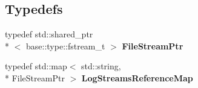 \subsection*{Typedefs}
\begin{DoxyCompactItemize}
\item 
\hypertarget{namespaceel_1_1base_a8b10bcfd674533f8340cd8c39fbf5233}{typedef std\-::shared\-\_\-ptr\\*
$<$ base\-::type\-::fstream\-\_\-t $>$ {\bfseries File\-Stream\-Ptr}}\label{namespaceel_1_1base_a8b10bcfd674533f8340cd8c39fbf5233}

\item 
\hypertarget{namespaceel_1_1base_af7602da9fe1d6c75985184fb0e39fd11}{typedef std\-::map$<$ std\-::string, \\*
File\-Stream\-Ptr $>$ {\bfseries Log\-Streams\-Reference\-Map}}\label{namespaceel_1_1base_af7602da9fe1d6c75985184fb0e39fd11}

\end{DoxyCompactItemize}

